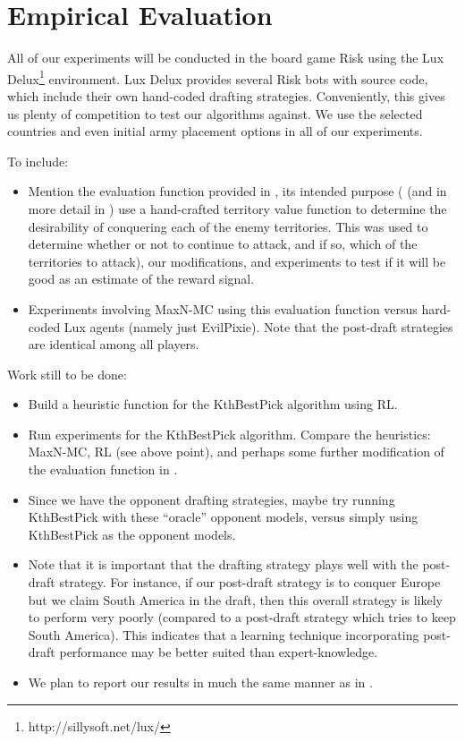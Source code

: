 \documentclass[letterpaper]{article}
\numberwithin{equation}{section}
\numberwithin{theorem}{section}
\numberwithin{lemma}{section}
\numberwithin{df}{section}
\begin{document}
\section{Empirical Evaluation}

All of our experiments will be conducted in the board game Risk using the Lux Delux\footnote{http://sillysoft.net/lux/} environment.  Lux Delux provides several Risk bots with source code, which include their own hand-coded drafting strategies.  Conveniently, this gives us plenty of competition to test our algorithms against.  We use the selected countries and even initial army placement options in all of our experiments.

To include:
\begin{itemize}
	\item Mention the evaluation function provided in \cite{RiskBots}, its intended purpose (\cite{RiskBots} (and in more detail in \cite{Ols2005}) use a hand-crafted territory value function to determine the desirability of conquering each of the enemy territories.  This was used to determine whether or not to continue to attack, and if so, which of the territories to attack), our modifications, and experiments to test if it will be good as an estimate of the reward signal.
	\item Experiments involving MaxN-MC using this evaluation function versus hard-coded Lux agents (namely just EvilPixie).  Note that the post-draft strategies are identical among all players.
\end{itemize}

Work still to be done:
\begin{itemize}
	\item Build a heuristic function for the KthBestPick algorithm using RL.
	\item Run experiments for the KthBestPick algorithm.  Compare the heuristics: MaxN-MC, RL (see above point), and perhaps some further modification of the evaluation function in \cite{RiskBots}.
	\item Since we have the opponent drafting strategies, maybe try running KthBestPick with these ``oracle'' opponent models, versus simply using KthBestPick as the opponent models.
	\item Note that it is important that the drafting strategy plays well with the post-draft strategy.  For instance, if our post-draft strategy is to conquer Europe but we claim South America in the draft, then this overall strategy is likely to perform very poorly (compared to a post-draft strategy which tries to keep South America).  This indicates that a learning technique incorporating post-draft performance may be better suited than expert-knowledge.
	\item We plan to report our results in much the same manner as in \cite{ZuckFelnerKraus2009}.
\end{itemize} 
\end{document}
